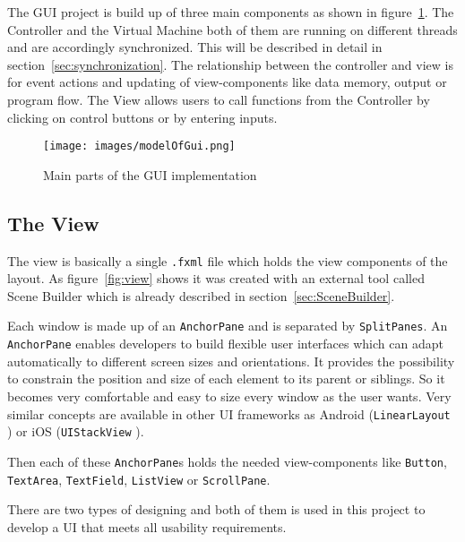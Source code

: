 The GUI project is build up of three main components as shown in figure~\ref{fig:partsOfGui}. The Controller and the Virtual Machine both of them are running on different threads and are accordingly synchronized. This will be described in detail in section~\ref{sec:synchronization}. The relationship between the controller and view is for event actions and updating of view-components like data memory, output or program flow. The View allows users to call functions from the Controller by clicking on control buttons or by entering inputs. 
\begin{figure}[h] 
	\centering
	\texttt{[image: images/modelOfGui.png]}
	\caption{Main parts of the GUI implementation}
	\label{fig:partsOfGui}
\end{figure}
\subsection{The View}\label{sec:TreeView}
The view is basically a single \lstinline$.fxml$ file which holds the view components of the layout. As figure~\ref{fig:view} shows it was created with an external tool called Scene Builder which is already described in section~\ref{sec:SceneBuilder}.

Each window is made up of an \texttt{AnchorPane} \cite{anchorpane_anchorpane_nodate} and is separated by \texttt{SplitPanes}. An \texttt{AnchorPane} enables developers to build flexible user interfaces which can adapt automatically to different screen sizes and orientations. It provides the possibility to constrain the position and size of each element to its parent or siblings. So it becomes very comfortable and easy to size every window as the user wants. Very similar concepts are available in other UI frameworks as Android (\texttt{LinearLayout} \cite{android_linearlayout_nodate}) or iOS (\texttt{UIStackView} \cite{apple_uistackview_nodate}).

Then each of these \texttt{AnchorPane}s holds the needed view-components like \texttt{Button}, \texttt{TextArea}, \texttt{TextField}, \texttt{ListView} or \texttt{ScrollPane}.

There are two types of designing and both of them is used in this project to develop a UI that meets all usability requirements.

